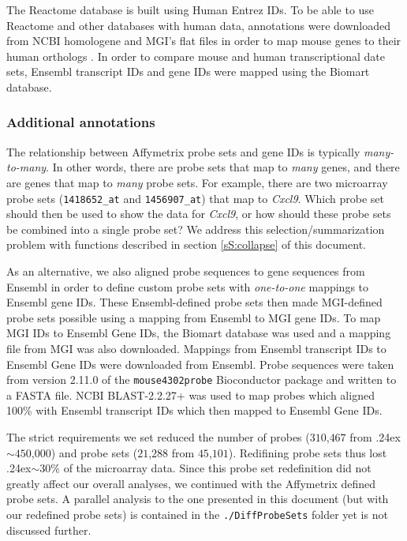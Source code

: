 The Reactome database is built using Human Entrez IDs. To be able to use
Reactome and other databases with human data, annotations were downloaded
from NCBI homologene and MGI's flat files in order
to map mouse genes to their human 
orthologs \cite{Eppig:2012ix}. In order to compare mouse and human
transcriptional date sets, Ensembl transcript IDs and gene IDs were mapped
using the Biomart database.

\subsubsection{Additional annotations}
\label{sS:newProbeSets}

The relationship between Affymetrix probe sets and gene IDs is typically
\emph{many-to-many}. In other words, there are probe sets that map
to \emph{many} genes, and there are genes that map to \emph{many}
probe sets. For example, there are two microarray probe sets
(\texttt{1418652\_at} and \texttt{1456907\_at}) that map to \emph{Cxcl9}.
Which probe set should then be used to show the data for \emph{Cxcl9}, or how should
these probe sets be combined into a single probe set? We address this 
selection/summarization problem with functions described in 
section \ref{sS:collapse} of this document. 

As an alternative, we also
aligned probe sequences to gene sequences from Ensembl \cite{Flicek:2012ks} in order to 
define custom probe sets with \emph{one-to-one} mappings to Ensembl gene IDs. 
These Ensembl-defined probe sets then made MGI-defined 
probe sets possible using a mapping from Ensembl to MGI gene IDs. To map MGI 
IDs to Ensembl Gene IDs, the Biomart database was used and
a mapping file from MGI was also downloaded. Mappings from Ensembl
transcript IDs to Ensembl Gene IDs were downloaded from Ensembl. Probe
sequences were taken from version 2\@.11\@.0 of the \texttt{mouse4302probe}
Bioconductor package and written to a FASTA file. NCBI BLAST-2\@.2\@.27+
was used to map probes which aligned 100\% with Ensembl transcript IDs which
then mapped to Ensembl Gene IDs. 

The strict requirements we set reduced the number of
probes ($310$,$467$ from {\raise.24ex\hbox{$\scriptstyle\sim$}}$450$,$000$) 
and probe sets ($21$,$288$ from $45$,$101$). Redifining probe sets 
thus lost {\raise.24ex\hbox{$\scriptstyle\sim$}}30\% of the microarray data. 
Since this probe set redefinition did not greatly affect our overall 
analyses, we continued with the Affymetrix
defined probe sets. A parallel analysis to the one presented in this document
(but with our redefined probe sets) is contained in the
\texttt{./DiffProbeSets} folder yet is not discussed further.

